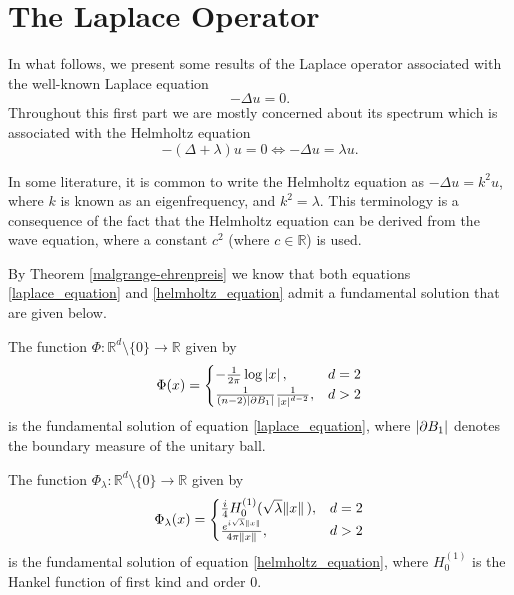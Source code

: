 \section{The Laplace Operator}
\label{section:laplace_op}

In what follows, we present some results of the Laplace operator associated with the well-known Laplace equation
\begin{equation} \label{laplace_equation}
    -\Delta u = 0.
\end{equation}
Throughout this first part we are mostly concerned about its spectrum which is associated with the Helmholtz equation
\begin{equation} \label{helmholtz_equation}
    -(\Delta+\lambda) u = 0 \iff -\Delta u = \lambda u.
\end{equation}

\begin{remark}
    In some literature, it is common to write the Helmholtz equation as \(-\Delta u = k^2 u\), where \(k\) is known as an eigenfrequency, and \(k^2 = \lambda\). This terminology is a consequence of the fact that the Helmholtz equation can be derived from the wave equation, where a constant \(c^2\) (where \(c \in \mathbb{R}\)) is used.
\end{remark}

By Theorem \ref{malgrange-ehrenpreis} we know that both equations \eqref{laplace_equation} and \eqref{helmholtz_equation} admit a fundamental solution that are given below.

\begin{proposition}
    The function \(\Phi: \mathbb{R}^d \setminus \{0\} \rightarrow \mathbb{R}\) given by
    \[
    \Phi(x) = \begin{cases}
        -\frac{1}{2 \pi} \log \abs*{x}, & d=2\\
        \frac{1}{(n-2)\abs{\partial B_1}}\frac{1}{\abs*{x}^{d-2}}, & d > 2
    \end{cases}    
    \]
    is the fundamental solution of equation \eqref{laplace_equation}, where \(\abs{\partial B_1}\) denotes the boundary measure of the unitary ball.
\end{proposition}
\begin{proposition}\label{helm_fund_sol}
    The function \(\Phi_\lambda: \mathbb{R}^d \setminus \{0\} \rightarrow \mathbb{R}\) given by
    \[
    \Phi_\lambda(x) = \begin{cases}
        \frac{i}{4} H_0^{(1)}(\sqrt{\lambda} \norm*{x}), & d=2\\
        \frac{e^{i \sqrt{\lambda} \norm*{x}}}{4 \pi \norm*{x}}, & d > 2
    \end{cases}    
    \]
    is the fundamental solution of equation \eqref{helmholtz_equation}, where \(H_0^{(1)}\) is the Hankel function of first kind and order 0.
\end{proposition}

